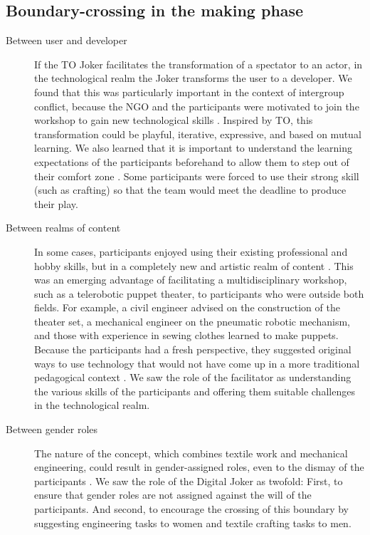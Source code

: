 \documentclass[dissertation,math,vertlayout,pdfa,colorlinks]{aaltoseries}
\begin{document}
\subsection{Boundary-crossing in the making phase}
\begin{description}
   \item[Between user and developer] If the TO Joker facilitates the transformation of a spectator to an actor, in the technological realm the Joker transforms the user to a developer. We found that this was particularly important in the context of intergroup conflict, because the NGO and the participants were motivated to join the workshop to gain new technological skills \cite[p. 19]{peledTeleroboticTheaterOppressed2025}. Inspired by TO, this transformation could be playful, iterative, expressive, and based on mutual learning. We also learned that it is important to understand the learning expectations of the participants beforehand to allow them to step out of their comfort zone \cite[p. 18]{peledTeleroboticTheaterOppressed2025}. Some participants were forced to use their strong skill (such as crafting) so that the team would meet the deadline to produce their play.
   \item[Between realms of content] In some cases, participants enjoyed using their existing professional and hobby skills, but in a completely new and artistic realm of content \cite[p. 18]{peledTeleroboticTheaterOppressed2025}. This was an emerging advantage of facilitating a multidisciplinary workshop, such as a telerobotic puppet theater, to participants who were outside both fields. For example, a civil engineer advised on the construction of the theater set, a mechanical engineer on the pneumatic robotic mechanism, and those with experience in sewing clothes learned to make puppets. Because the participants had a fresh perspective, they suggested original ways to use technology that would not have come up in a more traditional pedagogical context \cite[p. 18]{peledTeleroboticTheaterOppressed2025}. We saw the role of the facilitator as understanding the various skills of the participants and offering them suitable challenges in the technological realm.
   \item[Between gender roles] The nature of the concept, which combines textile work and mechanical engineering, could result in gender-assigned roles, even to the dismay of the participants \cite[p. 19]{peledTeleroboticTheaterOppressed2025}. We saw the role of the Digital Joker as twofold: First, to ensure that gender roles are not assigned against the will of the participants. And second, to encourage the crossing of this boundary by suggesting engineering tasks to women and textile crafting tasks to men.

\end{description}
\end{document}

